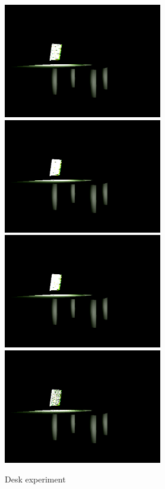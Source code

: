 \documentclass[twocolumn]{article}
\begin{document}
\begin{figure}[htbp]
    \centering
    \includegraphics[height=5cm]{img/desk-1.png}
    \includegraphics[height=5cm]{img/desk-2.png}
    \includegraphics[height=5cm]{img/desk-3.png}
    \includegraphics[height=5cm]{img/desk-4.png}
    \caption{Desk experiment}
    \label{fig:desk}
\end{figure}
\end{document}

